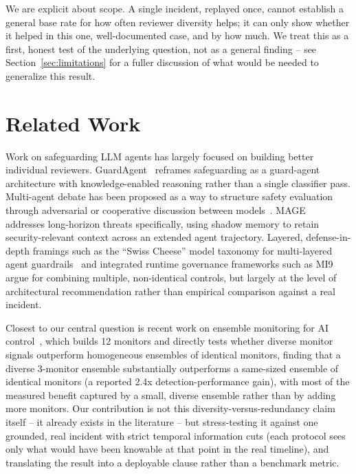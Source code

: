 \documentclass[11pt]{article}
\begin{document}
We are explicit about scope. A single incident, replayed once, cannot
establish a general base rate for how often reviewer diversity helps; it can
only show whether it helped in this one, well-documented case, and by how
much. We treat this as a first, honest test of the underlying question, not
as a general finding -- see Section~\ref{sec:limitations} for a fuller
discussion of what would be needed to generalize this result.

\section{Related Work}

Work on safeguarding LLM agents has largely focused on building better
individual reviewers. GuardAgent~\cite{guardagent} reframes safeguarding as a
guard-agent architecture with knowledge-enabled reasoning rather than a single
classifier pass. Multi-agent debate has been proposed as a way to structure
safety evaluation through adversarial or cooperative discussion between
models~\cite{debate-safety}. MAGE~\cite{mage} addresses long-horizon threats
specifically, using shadow memory to retain security-relevant context across
an extended agent trajectory. Layered, defense-in-depth framings such as the
``Swiss Cheese'' model taxonomy for multi-layered agent
guardrails~\cite{swiss-cheese} and
integrated runtime governance frameworks such as MI9~\cite{mi9} argue for
combining multiple, non-identical controls, but largely at the level of
architectural recommendation rather than empirical comparison against a real
incident.

Closest to our central question is recent work on ensemble monitoring for AI
control~\cite{ensemble-monitoring}, which builds 12 monitors and directly
tests whether diverse monitor signals outperform homogeneous ensembles of
identical monitors, finding that a diverse 3-monitor ensemble substantially
outperforms a same-sized ensemble of identical monitors (a reported 2.4x
detection-performance gain), with most of the measured benefit captured by
a small, diverse ensemble rather than by adding more monitors. Our
contribution is not this diversity-versus-redundancy claim itself -- it
already exists in the literature -- but stress-testing it
against one grounded, real incident with strict temporal information cuts
(each protocol sees only what would have been knowable at that point in the
real timeline), and translating the result into a deployable clause rather
than a benchmark metric.
\end{document}
